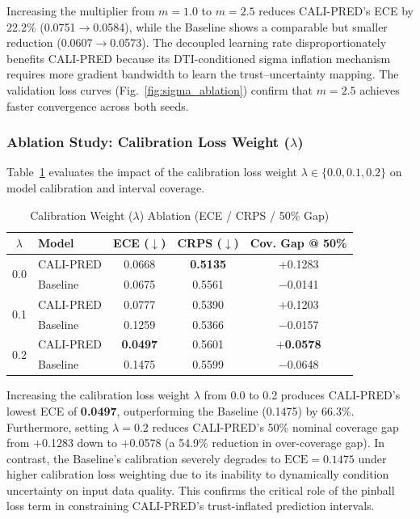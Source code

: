 \documentclass[journal]{IEEEtran}
\begin{document}
Increasing the multiplier from $m=1.0$ to $m=2.5$ reduces CALI-PRED's ECE by 22.2\% (0.0751$\to$0.0584), while the Baseline shows a comparable but smaller reduction (0.0607$\to$0.0573). The decoupled learning rate disproportionately benefits CALI-PRED because its DTI-conditioned sigma inflation mechanism requires more gradient bandwidth to learn the trust--uncertainty mapping. The validation loss curves (Fig.~\ref{fig:sigma_ablation}) confirm that $m=2.5$ achieves faster convergence across both seeds.

\subsubsection{Ablation Study: Calibration Loss Weight ($\lambda$)}
Table~\ref{tab:ablation_cw} evaluates the impact of the calibration loss weight $\lambda \in \{0.0, 0.1, 0.2\}$ on model calibration and interval coverage.

\begin{table}[htbp]
\centering
\caption{Calibration Weight ($\lambda$) Ablation (ECE / CRPS / 50\% Gap)}
\label{tab:ablation_cw}
\begin{tabular}{clccc}
\toprule
$\lambda$ & Model & ECE ($\downarrow$) & CRPS ($\downarrow$) & Cov. Gap @ 50\% \\
\midrule
\multirow{2}{*}{0.0} & CALI-PRED & 0.0668 & \textbf{0.5135} & $+$0.1283 \\
                      & Baseline  & 0.0675 & 0.5561 & $-$0.0141 \\
\midrule
\multirow{2}{*}{0.1} & CALI-PRED & 0.0777 & 0.5390 & $+$0.1203 \\
                      & Baseline  & 0.1259 & 0.5366 & $-$0.0157 \\
\midrule
\multirow{2}{*}{0.2} & CALI-PRED & \textbf{0.0497} & 0.5601 & \textbf{$+$0.0578} \\
                      & Baseline  & 0.1475 & 0.5599 & $-$0.0648 \\
\bottomrule
\end{tabular}
\end{table}

Increasing the calibration loss weight $\lambda$ from 0.0 to 0.2 produces CALI-PRED's lowest ECE of \textbf{0.0497}, outperforming the Baseline (0.1475) by 66.3\%. Furthermore, setting $\lambda = 0.2$ reduces CALI-PRED's 50\% nominal coverage gap from $+$0.1283 down to $+$0.0578 (a 54.9\% reduction in over-coverage gap). In contrast, the Baseline's calibration severely degrades to $\text{ECE}=0.1475$ under higher calibration loss weighting due to its inability to dynamically condition uncertainty on input data quality. This confirms the critical role of the pinball loss term in constraining CALI-PRED's trust-inflated prediction intervals.
\end{document}
